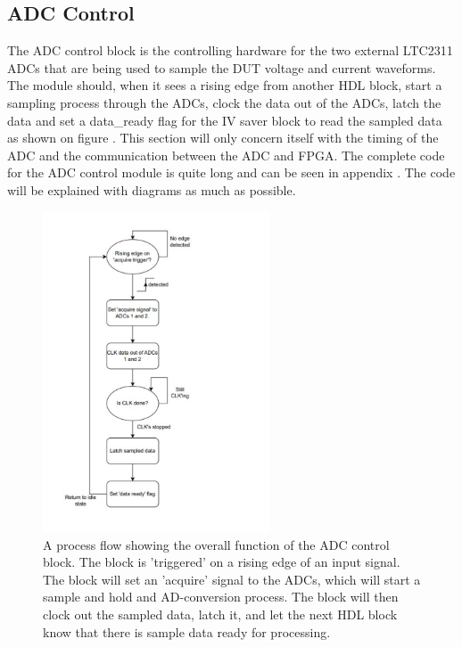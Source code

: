 \subsection{ADC Control} \label{subsec:ADC_CONTROL} 

The ADC control block is the controlling hardware for the two external LTC2311\cite{ADC_LTC2311} ADCs that are being used to sample the DUT voltage and current waveforms. The module should, when it sees a rising edge from another HDL block, start a sampling process through the ADCs, clock the data out of the ADCs, latch the data and set a data\_ready flag for the IV saver block to read the sampled data as shown on figure . This section will only concern itself with the timing of the ADC and the communication between the ADC and FPGA. The complete code for the ADC control module is quite long and can be seen in appendix . The code will be explained with diagrams as much as possible. 

\begin{figure}[H]
    \centering
    \includegraphics[clip, trim=0 0 0 0, width=0.6\textwidth]{Sections/7_SystemDesign/Figures/7_2_8_ADCControlOverallSignals_cropped.pdf}
    \caption{A process flow showing the overall function of the ADC control block. The block is 'triggered' on a rising edge of an input signal. The block will set an 'acquire' signal to the ADCs, which will start a sample and hold and AD-conversion process. The block will then clock out the sampled data, latch it, and let the next HDL block know that there is sample data ready for processing.}
    \label{fig:7_2_8_ADCControlProcess}
\end{figure}

